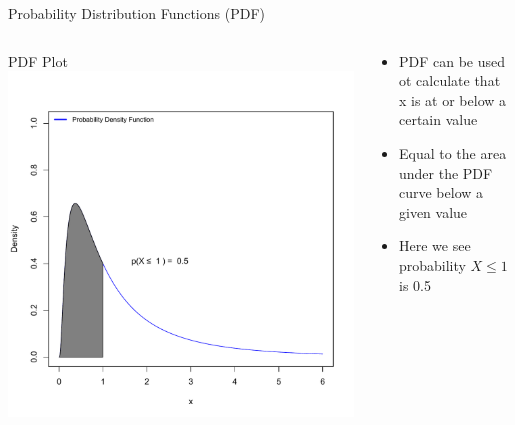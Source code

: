 \documentclass{beamer}
\begin{document}
\begin{frame}{Probability  Distribution Functions (PDF)}
\begin{columns}    
	\begin{column}{4cm}        
		\begin{center}
		PDF Plot           
	 	\includegraphics[width=1.0\textwidth]{Figure3}        
		\end{center}   
	 \end{column}    
	\begin{column}{5cm}        
	  
	\begin{itemize}
	\item PDF can be used ot calculate that  x is at or below a certain value
	\item Equal to the area under the PDF curve below a given value
	\item Here we see probability $X \le 1$ is 0.5
	\end{itemize}
	\end{column}
	\end{columns}

\end{frame}
\end{document}
